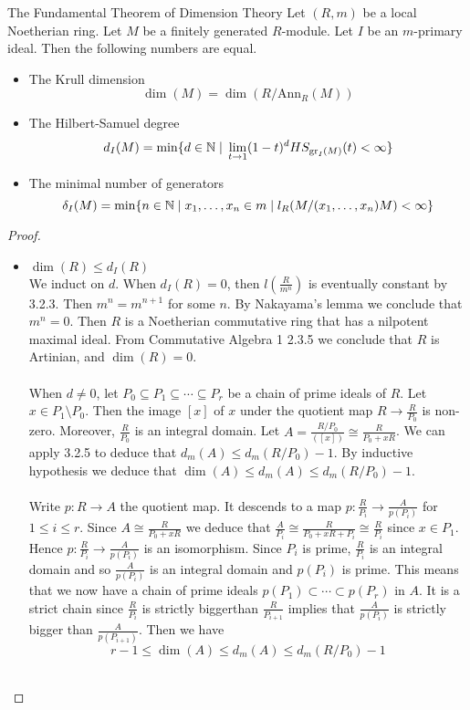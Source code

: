 \documentclass[a4paper]{article}
\begin{document}
\begin{thm}{The Fundamental Theorem of Dimension Theory}{} Let $(R,m)$ be a local Noetherian ring. Let $M$ be a finitely generated $R$-module. Let $I$ be an $m$-primary ideal. Then the following numbers are equal. 
\begin{itemize}
\item The Krull dimension $$\dim(M)=\dim(R/\text{Ann}_R(M))$$
\item The Hilbert-Samuel degree $$d_I(M)=\min\{d\in\mathbb{N}\;|\;\lim_{t\to 1}(1-t)^dHS_{\text{gr}_I(M)}(t)<\infty\}$$
\item The minimal number of generators $$\delta_I(M)=\min\{n\in\mathbb{N}\;|\;x_1,\dots,x_n\in m\;|\;l_R(M/(x_1,\dots,x_n)M)<\infty\}$$
\end{itemize} 
\begin{proof}~\\
\begin{itemize}
\item $\dim(R)\leq d_I(R)$\\
We induct on $d$. When $d_I(R)=0$, then $l\left(\frac{R}{m^n}\right)$ is eventually constant by 3.2.3. Then $m^n=m^{n+1}$ for some $n$. By Nakayama's lemma we conclude that $m^n=0$. Then $R$ is a Noetherian commutative ring that has a nilpotent maximal ideal. From Commutative Algebra 1 2.3.5 we conclude that $R$ is Artinian, and $\dim(R)=0$. \\~\\

When $d\neq 0$, let $P_0\subseteq P_1\subseteq\cdots\subseteq P_r$ be a chain of prime ideals of $R$. Let $x\in P_1\setminus P_0$. Then the image $[x]$ of $x$ under the quotient map $R\to\frac{R}{P_0}$ is non-zero. Moreover, $\frac{R}{P_0}$ is an integral domain. Let $A=\frac{R/P_0}{([x])}\cong\frac{R}{P_0+xR}$. We can apply 3.2.5 to deduce that $d_m(A)\leq d_m(R/P_0)-1$. By inductive hypothesis we deduce that $\dim(A)\leq d_m(A)\leq d_m(R/P_0)-1$. \\~\\

Write $p:R\to A$ the quotient map. It descends to a map $p:\frac{R}{P_i}\to\frac{A}{p(P_i)}$ for $1\leq i\leq r$. Since $A\cong\frac{R}{P_0+xR}$ we deduce that $\frac{A}{P_i}\cong\frac{R}{P_0+xR+P_i}\cong\frac{R}{P_i}$ since $x\in P_1$. Hence $p:\frac{R}{P_i}\to\frac{A}{p(P_i)}$ is an isomorphism. Since $P_i$ is prime, $\frac{R}{P_i}$ is an integral domain and so $\frac{A}{p(P_i)}$ is an integral domain and $p(P_i)$ is prime. This means that we now have a chain of prime ideals $p(P_1)\subset\cdots\subset p(P_r)$ in $A$. It is a strict chain since $\frac{R}{P_i}$ is strictly biggerthan $\frac{R}{P_{i+1}}$ implies that $\frac{A}{p(P_i)}$ is strictly bigger than $\frac{A}{p(P_{i+1})}$. Then we have $$r-1\leq\dim(A)\leq d_m(A)\leq d_m(R/P_0)-1$$~\\


\end{itemize}
\end{proof}
\end{thm}
\end{document}
